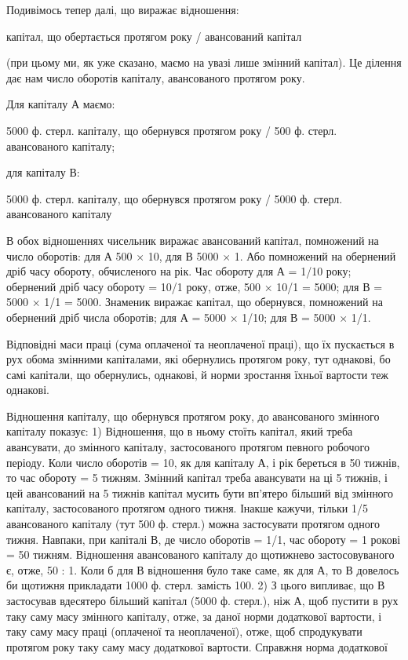 Подивімось тепер далі, що виражає відношення:

капітал, що обертається протягом року / авансований капітал

(при цьому ми, як уже сказано, маємо на увазі лише змінний капітал).
Це ділення дає нам число оборотів капіталу, авансованого протягом року.

Для капіталу А маємо:

5000 ф. стерл. капіталу, що обернувся протягом року / 500 ф. стерл. авансованого капіталу;

для капіталу В:

5000 ф. стерл. капіталу, що обернувся протягом року / 5000 ф. стерл. авансованого капіталу

В обох відношеннях чисельник виражає авансований капітал, помножений
на число оборотів: для А 500 × 10, для В 5000 × 1. Або помножений
на обернений дріб часу обороту, обчисленого на рік. Час
обороту для А = 1/10 року; обернений дріб часу обороту = 10/1 року,
отже, 500 × 10/1 = 5000; для В = 5000 × 1/1 = 5000. Знаменик виражає
капітал, що обернувся, помножений на обернений дріб числа
оборотів; для А = 5000 × 1/10; для В = 5000 × 1/1.

Відповідні маси праці (сума оплаченої та неоплаченої праці), що їх
пускається в рух обома змінними капіталами, які обернулись протягом
року, тут однакові, бо самі капітали, що обернулись, однакові, й норми
зростання їхньої вартости теж однакові.

Відношення капіталу, що обернувся протягом року, до авансованого
змінного капіталу показує: 1) Відношення, що в ньому стоїть капітал,
який треба авансувати, до змінного капіталу, застосованого протягом
певного робочого періоду. Коли число оборотів = 10, як для капіталу
А, і рік береться в 50 тижнів, то час обороту = 5 тижням. Змінний
капітал треба авансувати на ці 5 тижнів, і цей авансований на 5 тижнів
капітал мусить бути вп’ятеро більший від змінного капіталу, застосованого
протягом одного тижня. Інакше кажучи, тільки 1/5 авансованого
капіталу (тут 500 ф. стерл.) можна застосувати протягом одного тижня.
Навпаки, при капіталі В, де число оборотів = 1/1, час обороту = 1 рокові
= 50 тижням. Відношення авансованого капіталу до щотижнево застосовуваного
є, отже, 50 : 1. Коли б для В відношення було таке саме,
як для А, то В довелось би щотижня прикладати 1000 ф. стерл. замість
100. 2) З цього випливає, що В застосував вдесятеро більший
капітал (5000 ф. стерл.), ніж А, щоб пустити в рух таку саму масу змінного
капіталу, отже, за даної норми додаткової вартости, і таку саму
масу праці (оплаченої та неоплаченої), отже, щоб спродукувати протягом
року таку саму масу додаткової вартости. Справжня норма додаткової
